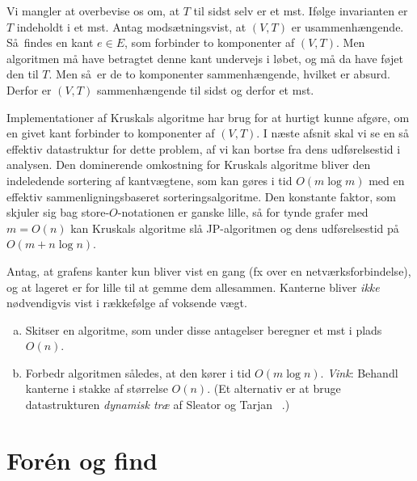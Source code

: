 Vi mangler at overbevise os om, at $T$ til sidst selv er et mst.
Ifølge invarianten er $T$ indeholdt i et mst.
Antag modsætningsvist, at $(V,T)$ er usammenhængende.
Så findes en kant $e\in E$, som forbinder to komponenter af $(V,T)$. 
Men algoritmen må have betragtet denne kant undervejs i løbet, og må da have føjet den til $T$.
Men så er de to komponenter sammenhængende, hvilket er absurd.
Derfor er $(V,T)$ sammenhængende til sidst og derfor et mst.

Implementationer af Kruskals algoritme har brug for at hurtigt kunne afgøre, om en givet kant forbinder to komponenter af $(V,T)$.
I næste afsnit skal vi se en så effektiv datastruktur for dette problem, af vi kan bortse fra dens udførelsestid i analysen.
Den dominerende omkostning for Kruskals algoritme bliver den indeledende sortering af kantvægtene, som kan gøres i tid $O(m\log m)$ med en effektiv sammenligningsbaseret sorteringsalgoritme.
Den konstante faktor, som skjuler sig bag store-$O$-notationen er ganske lille, så for tynde grafer med $m=O(n)$ kan Kruskals algoritme slå JP-algoritmen og dens udførelsestid på $O(m+n\log n)$. 


\begin{exerc}
  Antag, at grafens kanter kun bliver vist en gang (fx over en netværksforbindelse), og at lageret er for lille til at gemme dem allesammen. 
  Kanterne bliver \emph{ikke} nødvendigvis vist i rækkefølge af voksende vægt.
  \begin{enumerate}[(a)]
    \item Skitser en algoritme, som under disse antagelser beregner et mst i plads $O(n)$.
\item
  Forbedr algoritmen således, at den kører i tid $O(m\log n)$.
  \emph{Vink}: Behandl kanterne i stakke af størrelse $O(n)$.
      (Et alternativ er at bruge datastrukturen \emph{dynamisk træ} af Sleator og Tarjan ~\cite{SleTar83}.)
\end{enumerate}
\end{exerc}

\section{Forén og find}
%

